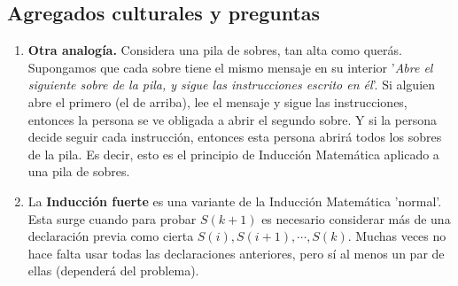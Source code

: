 \subsection{Agregados culturales y preguntas}
{
    \begin{enumerate}
        \item { \textbf{Otra analogía.}
        Considera una pila de sobres, tan alta como querás.
        Supongamos que cada sobre tiene el mismo mensaje en su interior '\textit{Abre el siguiente sobre de la pila, y sigue las instrucciones escrito en él}'.
        Si alguien abre el primero (el de arriba), lee el mensaje y sigue las instrucciones, entonces la persona se ve obligada a abrir el segundo sobre.
        Y si la persona decide seguir cada instrucción, entonces esta persona abrirá todos los sobres de la pila.
        Es decir, esto es el principio de Inducción Matemática aplicado a una pila de sobres.}

        \item La \textbf{Inducción fuerte} es una variante de la Inducción Matemática 'normal'. Esta surge cuando para probar $S(k + 1)$ es necesario considerar más de una declaración previa como cierta $S(i), S(i + 1), \cdots, S(k)$. Muchas veces no hace falta usar todas las declaraciones anteriores, pero sí al menos un par de ellas (dependerá del problema).
    \end{enumerate}
}

